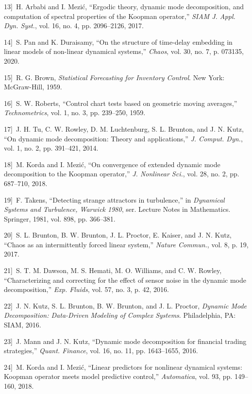 \documentclass{article}
\begin{document}
\noindent{}{[}13{]}~H. Arbabi and I. Mezi\'c, ``Ergodic theory, dynamic mode decomposition, and computation of spectral properties of the {Koopman} operator,'' \emph{SIAM J. Appl. Dyn. Syst.}, vol. 16, no. 4, pp. 2096--2126, 2017.

\noindent{}{[}14{]}~S. Pan and K. Duraisamy, ``On the structure of time-delay embedding in linear models of non-linear dynamical systems,'' \emph{Chaos}, vol. 30, no. 7, p. 073135, 2020.

\noindent{}{[}15{]}~R. G. Brown, \emph{Statistical Forecasting for Inventory Control}. New York: McGraw-Hill, 1959.

\noindent{}{[}16{]}~S. W. Roberts, ``Control chart tests based on geometric moving averages,'' \emph{Technometrics}, vol. 1, no. 3, pp. 239--250, 1959.

\noindent{}{[}17{]}~J. H. Tu, C. W. Rowley, D. M. Luchtenburg, S. L. Brunton, and J. N. Kutz, ``On dynamic mode decomposition: Theory and applications,'' \emph{J. Comput. Dyn.}, vol. 1, no. 2, pp. 391--421, 2014.

\noindent{}{[}18{]}~M. Korda and I. Mezi\'c, ``On convergence of extended dynamic mode decomposition to the {Koopman} operator,'' \emph{J. Nonlinear Sci.}, vol. 28, no. 2, pp. 687--710, 2018.

\noindent{}{[}19{]}~F. Takens, ``Detecting strange attractors in turbulence,'' in \emph{Dynamical Systems and Turbulence, Warwick 1980}, ser. Lecture Notes in Mathematics. Springer, 1981, vol. 898, pp. 366--381.

\noindent{}{[}20{]}~S. L. Brunton, B. W. Brunton, J. L. Proctor, E. Kaiser, and J. N. Kutz, ``Chaos as an intermittently forced linear system,'' \emph{Nature Commun.}, vol. 8, p. 19, 2017.

\noindent{}{[}21{]}~S. T. M. Dawson, M. S. Hemati, M. O. Williams, and C. W. Rowley, ``Characterizing and correcting for the effect of sensor noise in the dynamic mode decomposition,'' \emph{Exp. Fluids}, vol. 57, no. 3, p. 42, 2016.

\noindent{}{[}22{]}~J. N. Kutz, S. L. Brunton, B. W. Brunton, and J. L. Proctor, \emph{Dynamic Mode Decomposition: Data-Driven Modeling of Complex Systems}. Philadelphia, PA: SIAM, 2016.

\noindent{}{[}23{]}~J. Mann and J. N. Kutz, ``Dynamic mode decomposition for financial trading strategies,'' \emph{Quant. Finance}, vol. 16, no. 11, pp. 1643--1655, 2016.

\noindent{}{[}24{]}~M. Korda and I. Mezi{\'c}, ``Linear predictors for nonlinear dynamical systems: {Koopman} operator meets model predictive control,'' \emph{Automatica}, vol. 93, pp. 149--160, 2018.
\end{document}
